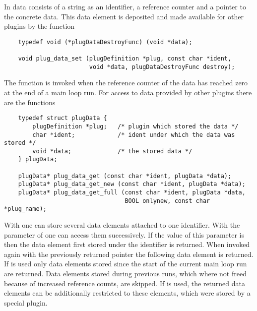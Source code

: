 In \icewing{} data consists of a string as an identifier, a
reference counter and a pointer to the concrete data. This data
element is deposited and made available for other plugins by the
function
\begin{small}
\linespread{0.9}
\begin{verbatim}
    typedef void (*plugDataDestroyFunc) (void *data);

    void plug_data_set (plugDefinition *plug, const char *ident,
                        void *data, plugDataDestroyFunc destroy);
\end{verbatim}
\end{small}
The function  is invoked when the reference counter
of the data has reached zero at the end of a main loop run. For
access to data provided by other plugins there are the functions
\begin{small}
\linespread{0.9}
\begin{verbatim}
    typedef struct plugData {
        plugDefinition *plug;   /* plugin which stored the data */
        char *ident;            /* ident under which the data was stored */
        void *data;             /* the stored data */
    } plugData;

    plugData* plug_data_get (const char *ident, plugData *data);
    plugData* plug_data_get_new (const char *ident, plugData *data);
    plugData* plug_data_get_full (const char *ident, plugData *data,
                                  BOOL onlynew, const char *plug_name);
\end{verbatim}
\end{small}
With  one can store several data elements
attached to one identifier. With the parameter  of
 one can access them successively. If the
value of this parameter is  then the data element first
stored under the identifier is returned. When invoked again with the
previously returned pointer the following data element is
returned. If  is used only data elements
stored since the start of the current main loop run are
returned. Data elements stored during previous runs, which where not
freed because of increased reference counts, are skipped. If
 is used, the returned data elements
can be additionally restricted to these elements, which were stored
by a special plugin.


